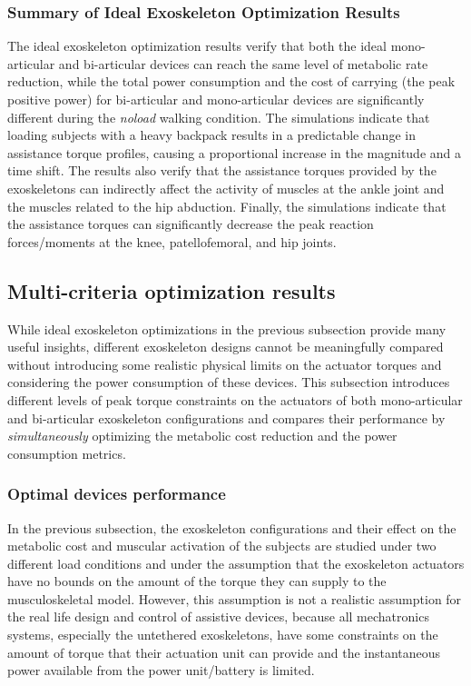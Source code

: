\documentclass[10pt,letterpaper]{article}
\begin{document}
\subsubsection*{Summary of Ideal Exoskeleton Optimization Results}


The ideal exoskeleton optimization results verify that both the ideal mono-articular and bi-articular devices can reach the same level of metabolic rate reduction, while the total power consumption and the cost of carrying (the peak positive power) for bi-articular and mono-articular devices are significantly different during the \emph{noload} walking condition. The simulations indicate that loading subjects with a heavy backpack results in a predictable change in assistance torque profiles, causing a proportional increase in the magnitude and a time shift. The results also verify that the assistance torques provided by the exoskeletons can indirectly affect the activity of muscles at the ankle joint and the muscles related to the hip abduction. Finally, the simulations indicate that the assistance torques can  significantly decrease the peak reaction forces/moments at the knee, patellofemoral, and hip joints.


\subsection*{Multi-criteria optimization results}

While ideal exoskeleton optimizations in the previous subsection provide many useful insights, different exoskeleton designs cannot be meaningfully compared without introducing some realistic physical limits on the actuator torques and considering the power consumption of these devices. This subsection introduces different levels of peak torque constraints on the actuators of both mono-articular and bi-articular exoskeleton configurations and compares their performance by \emph{simultaneously} optimizing the metabolic cost reduction and the power consumption metrics.


\subsubsection*{Optimal devices performance}

In the previous subsection, the exoskeleton configurations and their effect on the metabolic cost and muscular activation of the subjects are studied under two different load conditions and under the assumption that the exoskeleton actuators have no bounds on the amount of the torque they can supply to the musculoskeletal model. However, this assumption is not a realistic assumption for the real life design and control of assistive devices, because all mechatronics systems, especially the untethered exoskeletons, have some constraints on the amount of torque that their actuation unit can provide and the instantaneous power available from the power unit/battery is limited.
\end{document}
